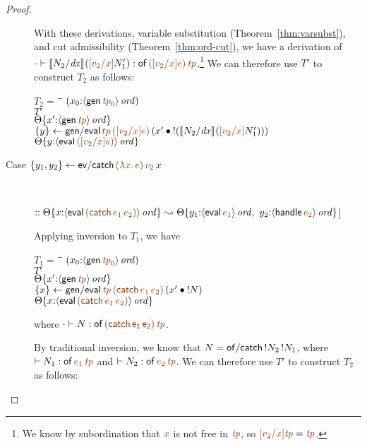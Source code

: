 \begin{proof}
\begin{description}
With these derivations, 
variable substitution (Theorem~\ref{thm:varsubst}), and cut
admissibility (Theorem~\ref{thm:ord-cut}), we have a derivation of
$\cdot \vdash \rsubst{N_2}{\it dx}{(\lf{[v_2/x]}N_1')} : {\sf
  of}\,\lf{([v_2/x]e)}\,\lf{\it tp}$.\footnote{We know by
  subordination that $\lf{x}$ is not free in $\lf{\it tp}$, so
  $\lf{[v_2/x]{\it tp}} = \lf{\it tp}$.}  We can therefore use $T'$ to
construct $T_2$ as follows:
\begin{tabbing}
$T_2 = ~$ \= \qquad \= $(x_0{:}\istrue{\susp{{\sf gen}\,\lf{{\it tp}_0}}})$
\\
\>$T'$
\\
\>\>$\tackon{\Theta}{x'{:}\istrue{\susp{{\sf gen}\,\lf{\it tp}}}}$
\\
\>$\trstep{y}
     {{\sf gen/eval}\,\lf{tp}\,\lf{([v_2/x]e)}\,(\tfuser{x'}{\tbangr{(\rsubst{N_2}{\it
  dx}{(\lf{[v_2/x]}N_1')})}})}$
\\
\>\>$\tackon{\Theta}{y{:}\istrue{\susp{{\sf eval}\,\lf{([v_2/x]e)}}}}$
\end{tabbing}

\item 
  [Case $\trstep{y_1,y_2}{{\sf ev/catch}\,\lf{(\lambda x.\,e)}\,\lf{v_2}\,x}$]~
 
\qquad $:: \tackon{\Theta}{x{:}\istrue{\susp{{\sf eval}\,\lf{({\sf catch}\,e_1\,e_2)}}}}
       \leadsto 
        \tackon{\Theta}{y_1{:}\istrue{\susp{{\sf eval}\,\lf{e_1}}}, ~
                   y_2{:}\istrue{\susp{{\sf handle}\,\lf{e_2}}}}$]~

\medskip
Applying inversion to $T_1$, we have

\begin{tabbing}
$T_1 = ~$ \= \qquad \= $(x_0{:}\istrue{\susp{{\sf gen}\,\lf{{\it tp}_0}}})$
\\
\>$T'$
\\
\>\>$\tackon{\Theta}{x'{:}\istrue{\susp{{\sf gen}\,\lf{{\it tp}}}}}$
\\
\>$\trstep{x}
     {{\sf gen/eval}\,\lf{\it tp}\,\lf{({\sf catch}\,e_1\,e_2)}\,(\tfuser{x'}{\tbangr{N}})}$
\\
\>\>$\tackon{\Theta}{x{:}\istrue{\susp{{\sf eval}\,\lf{({\sf catch}\,e_1\,e_2)}}}}$
\end{tabbing}
where $\cdot \vdash N : \sf of\,\lf{({\sf catch}\,e_1\,e_2)}\,\lf{\it tp}$. 

\medskip
By traditional inversion, we 
know that $N = {\sf of/catch}\,{!}{N_2}\,{!}{N_1}$, where
 $\vdash N_1 : {\sf of}\,\lf{e_1}\,\lf{\it tp}$ and $\vdash N_2 :
{\sf of}\,\lf{e_2}\,\lf{\it tp}$.
We can therefore use $T'$ to construct $T_2$ as follows:


\end{description}
\end{proof}
